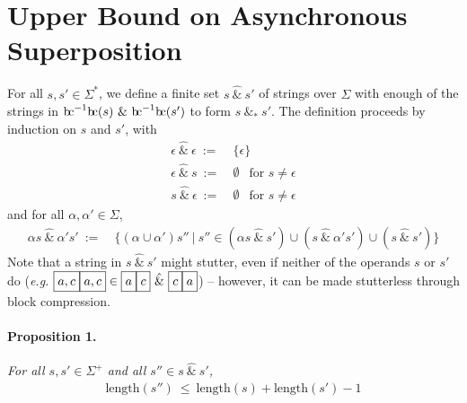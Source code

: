\documentclass[a4paper,11pt,leqno]{article}
\newcommand{\bc}{{\rm b\!c}}
\newcommand{\vph}[1]{\vphantom{#1}}
\newcommand{\ebox}[1]{\fbox{$\vph{',}#1$}}
\begin{document}
\section{Upper Bound on Asynchronous Superposition}\label{upper}
For all $s,s'\in \Sigma^{\ast}$, we define a finite set
$s~\hat{\&}~s'$ of strings over $\Sigma$ with enough of 
the strings in $\bc^{-1}\bc(s)~\&~\bc^{-1}\bc(s')$
to form $s~\&_*~s'$.
The definition proceeds by induction on $s$ and $s'$, with
\begin{align}
\epsilon\ \hat{\&}\ \epsilon \ :=& \ \{\epsilon\}\\
\epsilon\ \hat{\&}\ s \ :=& \ \emptyset\ \ \mbox{ for } s\neq\epsilon\\
s\ \hat{\&}\ \epsilon \ :=& \ \emptyset\ \ \mbox{ for } s\neq\epsilon
\end{align}
and for all $\alpha,\alpha'\in \Sigma$,
\begin{align}
\alpha s~\hat{\&}~\alpha's' \ :=&~\{(\alpha\cup\alpha')s''\ | \ s''\in (\alpha 
s~\hat{\&}~s') \cup 
(s~\hat{\&}~\alpha's') \cup (s~\hat{\&}~s')\}
\end{align}
Note that a string in $s\ \hat{\&}\ s'$ might stutter, even if neither of the 
operands $s$ or $s'$ do
(\textit{e.g.} $\ebox{a,c}\ebox{a,c}\in
\ebox{a}\ebox{c}\ \hat{\&}\ 
\ebox{c}\ebox{a}$)
-- however, it can be made stutterless through block compression.
\paragraph{Proposition 1.} {\sl For all  $s, s' \in \Sigma^+$
	and all $s''\in s\ \hat{\&}\ s'$,}
\begin{align}
\mbox{length}(s'')\ \leq\ \mbox{length}(s) + \mbox{length}(s') -1
\end{align}
\end{document}
